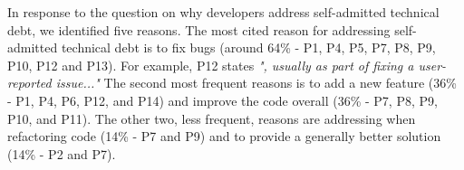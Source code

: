 In response to the question on why developers address self-admitted technical debt, we identified five reasons. The most cited reason for addressing self-admitted technical debt is to fix bugs (around 64\% - P1, P4, P5, P7, P8, P9, P10, P12 and P13). For example, P12 states \textit{", usually as part of fixing a user-reported issue..."} The second most frequent reasons is to add a new feature (36\% - P1, P4, P6, P12, and P14) and improve the code overall (36\% - P7, P8, P9, P10, and P11). The other two, less frequent, reasons are addressing \SATD when refactoring code (14\% - P7 and P9) and to provide a generally better solution (14\% - P2 and P7). 



